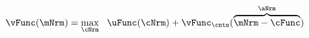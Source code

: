   \begin{equation}\begin{gathered}\begin{aligned}
        \vFunc(\mNrm) & = \max_{\cNrm}~~\uFunc({\cNrm}) +\vFunc_{\cntn}(\overbrace{\mNrm-\cFunc}^{\aNrm}) \label{eq:vMid}
      \end{aligned}\end{gathered}\end{equation}
